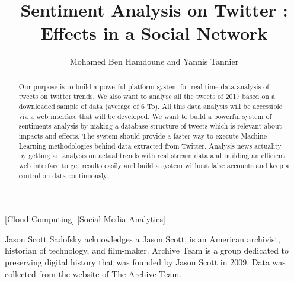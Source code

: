 \documentclass{acmtog} %
\begin{document}

\title{Sentiment Analysis on Twitter : Effects in a Social Network} %

\author{Mohamed Ben Hamdoune {\upshape and} Yannis Tannier
}

[Cloud Computing]
[Social Media Analytics]




\maketitle

\begin{bottomstuff}
Jason Scott Sadofsky acknowledges a Jason Scott, is an American archivist, historian of technology, and film-maker. Archive Team is a group dedicated to preserving digital history that was founded by Jason Scott in 2009. Data was collected from the website of The Archive Team.
\end{bottomstuff}


\begin{abstract}

Our purpose is to build a powerful platform system for real-time data analysis of tweets on twitter trends. We also want to analyse all the tweets of 2017 based on a downloaded sample of data (average of 6 To). All this data analysis will be accessible via a web interface that will be developed. We want to build a powerful system of sentiments analysis by making a database structure of tweets which is relevant about impacts and effects. The system should provide a faster way to execute Machine Learning methodologies behind data extracted from Twitter. Analysis news actuality by getting an analysis on actual trends with real stream data and building an efficient web interface to get results easily and build a system without false accounts and keep a control on data continuously.
\end{abstract}
\end{document}
